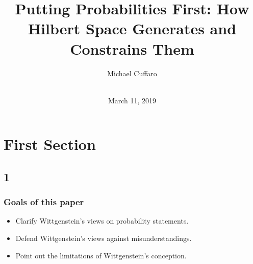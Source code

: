 \documentclass{beamer}
\begin{document}
\title[]{Putting Probabilities First: How Hilbert Space Generates and
  Constrains Them}
\author[M. Cuffaro]{Michael Cuffaro{\color{lightgrey}}}
\date{\mbox{ } \\[20pt] March 11, 2019}


\begin{frame}
\titlepage
{}
\end{frame}

\section*{First Section}

\subsection*{1}
\begin{frame}
\frametitle{Goals of this paper}
\begin{itemize}
\item Clarify Wittgenstein's views on probability statements.
\item Defend Wittgenstein's views against misunderstandings.
\item Point out the limitations of Wittgenstein's conception.
\end{itemize}
\end{frame}
\end{document}
